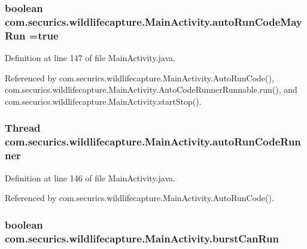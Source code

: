 \subsubsection[{auto\+Run\+Code\+May\+Run}]{\setlength{\rightskip}{0pt plus 5cm}boolean com.\+securics.\+wildlifecapture.\+Main\+Activity.\+auto\+Run\+Code\+May\+Run =true\hspace{0.3cm}{\ttfamily [private]}}\label{classcom_1_1securics_1_1wildlifecapture_1_1_main_activity_a7a9453ba94134c5f56cf5444359fe753}


Definition at line 147 of file Main\+Activity.\+java.



Referenced by com.\+securics.\+wildlifecapture.\+Main\+Activity.\+Auto\+Run\+Code(), com.\+securics.\+wildlifecapture.\+Main\+Activity.\+Auto\+Code\+Runner\+Runnable.\+run(), and com.\+securics.\+wildlifecapture.\+Main\+Activity.\+start\+Stop().

\subsubsection[{auto\+Run\+Code\+Runner}]{\setlength{\rightskip}{0pt plus 5cm}Thread com.\+securics.\+wildlifecapture.\+Main\+Activity.\+auto\+Run\+Code\+Runner\hspace{0.3cm}{\ttfamily [private]}}\label{classcom_1_1securics_1_1wildlifecapture_1_1_main_activity_a538a2543e0e8343334fc65c698627cc2}


Definition at line 146 of file Main\+Activity.\+java.



Referenced by com.\+securics.\+wildlifecapture.\+Main\+Activity.\+Auto\+Run\+Code().

\subsubsection[{burst\+Can\+Run}]{\setlength{\rightskip}{0pt plus 5cm}boolean com.\+securics.\+wildlifecapture.\+Main\+Activity.\+burst\+Can\+Run\hspace{0.3cm}{\ttfamily [private]}}\label{classcom_1_1securics_1_1wildlifecapture_1_1_main_activity_a8b95534a1946729aa4d6f81f23e790f3}


